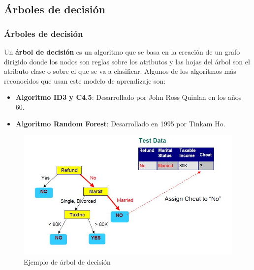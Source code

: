 \documentclass[9pt]{beamer} %
\begin{document}
	\subsection{Árboles de decisión}
		\begin{frame}
		\frametitle{Árboles de decisión}
		Un \textbf{árbol de decisión}  es un algoritmo que se basa en la creación de un grafo dirigido donde los nodos son reglas sobre los atributos y las hojas del árbol son el atributo clase o sobre el que se va a clasificar.
		Algunos de los algoritmos más reconocidos  que usan este modelo de aprendizaje son:
		\begin{itemize}
			\item \textbf{Algoritmo ID3 y C4.5}: Desarrollado por John Ross Quinlan en los años 60.
			\item \textbf{Algoritmo Random Forest}: Desarrollado en 1995 por Tinkam Ho.
		\end{itemize}
						\begin{figure}[H]
		\includegraphics[scale=0.35]{tree} 
		\caption{Ejemplo de árbol de decisión}
	\end{figure}
		\end{frame}
\end{document}
